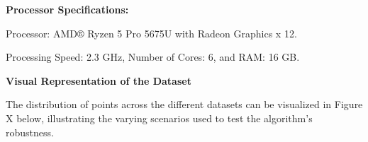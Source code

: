 \vspace*{6mm}  

\textbf{Processor Specifications:}


Processor: AMD® Ryzen 5 Pro 5675U with Radeon Graphics x 12.


Processing Speed: 2.3 GHz, Number of Cores: 6, and RAM: 16 GB.


\vspace*{6mm}  

\textbf{Visual Representation of the Dataset}

The distribution of points across the different datasets can be visualized in Figure X below, illustrating the varying scenarios used to test the algorithm's robustness.





